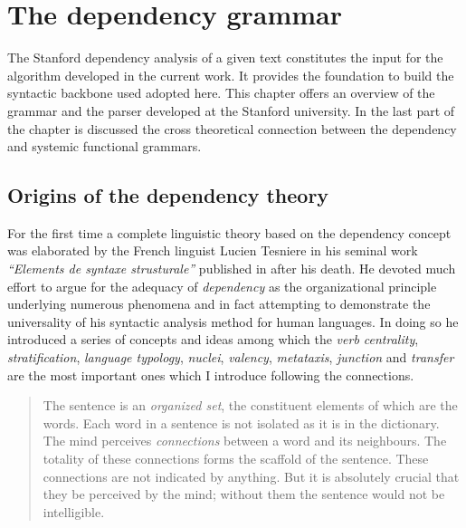 \chapter{The dependency grammar}
\label{ch:dependecy-grappamr}

The Stanford dependency analysis of a given text constitutes the input for the algorithm developed in the current work. It provides the foundation to build the syntactic backbone used adopted here. This chapter offers an overview of the grammar and the parser developed at the Stanford university. In the last part of the chapter is discussed the cross theoretical connection between the dependency and systemic functional grammars. 

\section{Origins of the dependency theory}
For the first time a complete linguistic theory based on the dependency concept was elaborated by the French linguist Lucien Tesniere in his seminal work \textit{``Elements de syntaxe strusturale''} published in \citeyear{Tesniere59} after his death. He devoted much effort to argue for the adequacy of \textit{dependency} as the organizational principle underlying numerous phenomena and in fact attempting to demonstrate the universality of his syntactic analysis method for human languages. In doing so he introduced a series of concepts and ideas among which the \textit{verb centrality}, \textit{stratification}, \textit{language typology}, \textit{nuclei}, \textit{valency}, \textit{metataxis}, \textit{junction} and \textit{transfer} are the most important ones which I introduce following the connections.


\begin{quotation}
    The sentence is an \textit{organized set}, the constituent elements of which are the words. Each word in a sentence is not isolated as it is in the dictionary. The mind perceives \textit{connections} between a word and its neighbours. The totality of these connections forms the scaffold of the sentence. These connections are not indicated by anything. But it is absolutely crucial that they be perceived by the mind; without them the sentence would not be intelligible. \citep[3]{Tesniere2015}
\end{quotation}

